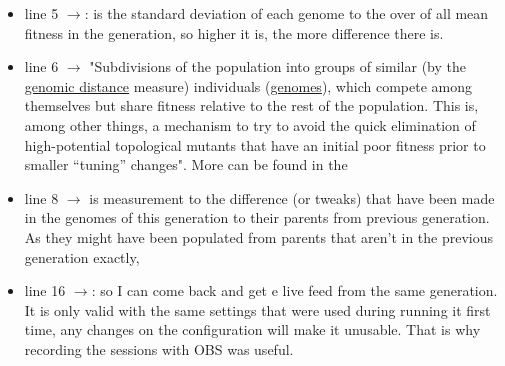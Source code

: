 \begin{itemize}
\item line 5 $\rightarrow$: is the standard deviation of each genome to the over of all mean fitness in the generation, so higher it is, the more difference there is.


\item line 6 $\rightarrow$ "Subdivisions of the population into groups of similar (by the \href{https://neat-python.readthedocs.io/en/latest/glossary.html#term-genomic-distance}{genomic distance} measure) individuals (\href{https://neat-python.readthedocs.io/en/latest/glossary.html#term-genome}{genomes}), which compete among themselves but share fitness relative to the rest of the population. This is, among other things, a mechanism to try to avoid the quick elimination of high-potential topological mutants that have an initial poor fitness prior to smaller “tuning” changes". More can be found in the 


\item line 8 $\rightarrow$ is measurement to the difference (or tweaks) that have been made in the genomes of this generation to their parents from previous generation. As they might have been populated from parents that aren't in the previous generation exactly,

\item line 16 $\rightarrow$: so I can come back and get e live feed from the same generation. It is only valid with the same settings that were used during running it first time, any changes on the configuration will make it unusable. That is why recording the sessions with OBS was useful.
\end{itemize}
 
 
 
 
 
 
 
 
 
 
